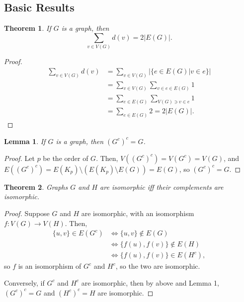 \documentclass[a4paper,12pt]{article}
\newtheorem{theorem}{Theorem}
\newtheorem{lemma}{Lemma}
\begin{document}
\subsection{Basic Results}

\begin{theorem}
If $G$ is a graph, then
\[\sum_{v \in V(G)} d(v) = 2|E(G)|.\]
\end{theorem}

\begin{proof}
\begin{align*}
\sum_{v \in V(G)} d(v)
& = \sum_{v \in V(G)} |\{e \in E(G) | v \in e \}| \\
& = \sum_{v \in V(G)} \sum_{v \in e \in E(G)} 1 \\
& = \sum_{e \in E(G)} \sum_{V(G) \ni v \in e} 1 \\
& = \sum_{e \in E(G)} 2
= 2 |E(G)|.
\end{align*}
\end{proof}

\begin{lemma}
If $G$ is a graph, then $(G^c)^c = G$.
\end{lemma}

\begin{proof}
Let $p$ be the order of $G$. Then,
$V((G^c)^c) = V(G^c) = V(G)$, and
$E((G^c)^c) = E(K_p) \setminus (E(K_p) \setminus E(G)) = E(G)$, so
$(G^c)^c = G$.
\end{proof}

\begin{theorem}
Graphs $G$ and $H$ are isomorphic iff their complements are isomorphic.
\end{theorem}

\begin{proof}
Suppose $G$ and $H$ are isomorphic, with an isomorphism $f : V(G) \to V(H)$.
Then,
\begin{align*}
\{u, v\} \in E(G^c)
& \iff \{u, v\} \not\in E(G) \\
& \iff \{f(u), f(v)\} \not\in E(H) \\
& \iff \{f(u), f(v)\} \in E(H^c),
\end{align*}
so $f$ is an isomorphism of $G^c$ and $H^c$, so the two are isomorphic.

Conversely, if $G^c$ and $H^c$ are isomorphic, then by above and Lemma 1,
$(G^c)^c = G$ and $(H^c)^c = H$ are isomorphic.
\end{proof}
\end{document}
